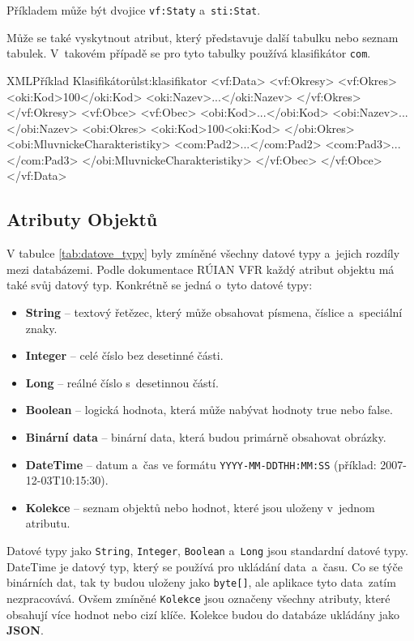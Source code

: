 Příkladem může být dvojice \texttt{vf:Staty} a~\texttt{sti:Stat}.

Může se také vyskytnout atribut, který představuje další tabulku nebo seznam tabulek.
V~takovém případě se pro tyto tabulky používá klasifikátor \texttt{com}.

\begin{code}{XML}{Příklad Klasifikátorů}{lst:klasifikator}
<vf:Data>
    <vf:Okresy>
        <vf:Okres>
            <oki:Kod>100</oki:Kod>
            <oki:Nazev>...</oki:Nazev>
        </vf:Okres>
    </vf:Okresy>
    <vf:Obce>
        <vf:Obec>
            <obi:Kod>...</obi:Kod>
            <obi:Nazev>...</obi:Nazev>
            <obi:Okres>
                <oki:Kod>100<oki:Kod>
            </obi:Okres>
            <obi:MluvnickeCharakteristiky>
                <com:Pad2>...</com:Pad2>
                <com:Pad3>...</com:Pad3>
            </obi:MluvnickeCharakteristiky>
        </vf:Obec>
    </vf:Obce>
</vf:Data>
\end{code}

\subsection{Atributy Objektů}
V tabulce \ref{tab:datove_typy} byly zmíněné všechny datové typy a~jejich rozdíly mezi databázemi.
Podle dokumentace RÚIAN VFR \cite{ruian_vfr} každý atribut objektu má také svůj datový typ.
Konkrétně se jedná o~tyto datové typy:
\begin{itemize}
    \item \textbf{String} -- textový řetězec, který může obsahovat písmena, číslice a~speciální znaky.
    \item \textbf{Integer} -- celé číslo bez desetinné části.
    \item \textbf{Long} -- reálné číslo s~desetinnou částí.
    \item \textbf{Boolean} -- logická hodnota, která může nabývat hodnoty true nebo false.
    \item \textbf{Binární data} -- binární data, která budou primárně obsahovat obrázky.
    \item \textbf{DateTime} -- datum a~čas ve formátu \texttt{YYYY-MM-DDTHH:MM:SS} (příklad: 2007-12-03T10:15:30).
    \item \textbf{Kolekce} -- seznam objektů nebo hodnot, které jsou uloženy v~jednom atributu.
\end{itemize}

Datové typy jako \texttt{String}, \texttt{Integer}, \texttt{Boolean} a~\texttt{Long} jsou standardní datové typy.
DateTime je datový typ, který se používá pro ukládání data~a~času. Co se týče binárních dat, tak ty budou uloženy jako \texttt{byte[]}, 
ale aplikace tyto data~zatím nezpracovává.
Ovšem zmíněné \texttt{Kolekce} jsou označeny všechny atributy, které obsahují více hodnot nebo cizí klíče.
Kolekce budou do databáze ukládány jako \textbf{JSON}.

